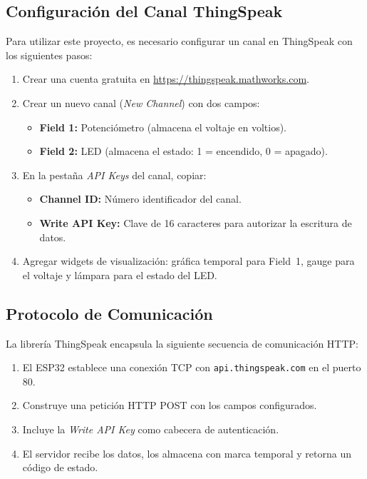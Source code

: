 \documentclass[12pt,a4paper]{article}
\begin{document}
\subsection{Configuración del Canal ThingSpeak}

Para utilizar este proyecto, es necesario configurar un canal en ThingSpeak con los siguientes pasos:

\begin{enumerate}
    \item Crear una cuenta gratuita en \url{https://thingspeak.mathworks.com}.
    \item Crear un nuevo canal (\textit{New Channel}) con dos campos:
    \begin{itemize}
        \item \textbf{Field 1:} Potenciómetro (almacena el voltaje en voltios).
        \item \textbf{Field 2:} LED (almacena el estado: 1 = encendido, 0 = apagado).
    \end{itemize}
    \item En la pestaña \textit{API Keys} del canal, copiar:
    \begin{itemize}
        \item \textbf{Channel ID:} Número identificador del canal.
        \item \textbf{Write API Key:} Clave de 16 caracteres para autorizar la escritura de datos.
    \end{itemize}
    \item Agregar widgets de visualización: gráfica temporal para Field~1, gauge para el voltaje y lámpara para el estado del LED.
\end{enumerate}

\subsection{Protocolo de Comunicación}

La librería ThingSpeak encapsula la siguiente secuencia de comunicación HTTP:

\begin{enumerate}
    \item El ESP32 establece una conexión TCP con \texttt{api.thingspeak.com} en el puerto 80.
    \item Construye una petición HTTP POST con los campos configurados.
    \item Incluye la \textit{Write API Key} como cabecera de autenticación.
    \item El servidor recibe los datos, los almacena con marca temporal y retorna un código de estado.
\end{enumerate}
\end{document}
